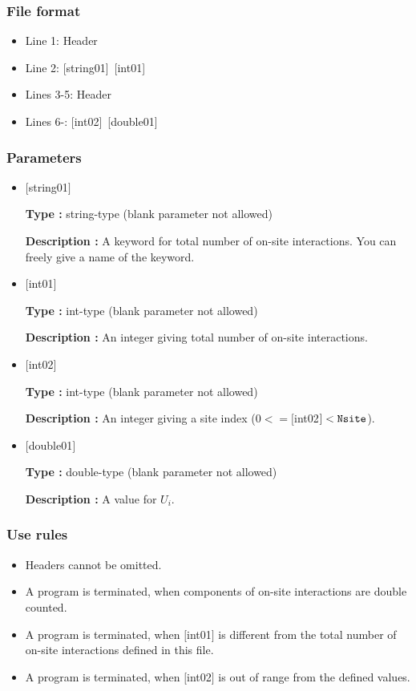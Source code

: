 \subsubsection{File format}
 \begin{itemize}
   \item  Line 1:  Header
   \item  Line 2:   [string01]~[int01]
   \item  Lines 3-5:  Header
   \item  Lines 6-:  [int02]~[double01] 
  \end{itemize}
\subsubsection{Parameters}
 \begin{itemize}

   \item  $[$string01$]$
   
    {\bf Type :} string-type (blank parameter not allowed)

   {\bf Description :} A keyword for total number of on-site interactions. You can freely give a name of the keyword.

   \item  $[$int01$]$
   
    {\bf Type :} int-type (blank parameter not allowed)

   {\bf Description :} An integer giving total number of on-site interactions.

  \item  $[$int02$]$
  
 {\bf Type :} int-type (blank parameter not allowed)

{\bf Description :} An integer giving a site index ($0<= [$int02$]<\verb|Nsite|$).
 
 \item  $[$double01$]$
   
   {\bf Type :} double-type (blank parameter not allowed)

  {\bf Description :}  A value for $U_i$.

\end{itemize}

\subsubsection{Use rules}
\begin{itemize}
\item Headers cannot be omitted. 
\item A program is terminated, when components of on-site interactions are double counted.
\item A program is terminated, when $[$int01$]$ is different from the total number of on-site interactions defined in this file.
\item A program is terminated, when $[$int02$]$ is out of range from the defined values.
\end{itemize}

